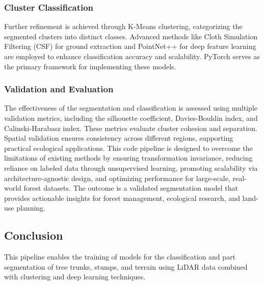 \documentclass[../report.tex]{subfiles}
\begin{document}
\subsubsection{Cluster Classification}
Further refinement is achieved through K-Means clustering, categorizing the segmented clusters into distinct classes. Advanced methods like Cloth Simulation Filtering (CSF) for ground extraction and PointNet++ for deep feature learning are employed to enhance classification accuracy and scalability. PyTorch serves as the primary framework for implementing these models.\cite{ClothSF}\cite{PointNet++}
\subsubsection{Validation and Evaluation}
The effectiveness of the segmentation and classification is assessed using multiple validation metrics, including the silhouette coefficient, Davies-Bouldin index, and Calinski-Harabasz index. These metrics evaluate cluster cohesion and separation. Spatial validation ensures consistency across different regions, supporting practical ecological applications.\cite{Davies-Bouldin}\cite{Calinski}
This code pipeline is designed to overcome the limitations of existing methods by ensuring transformation invariance, reducing reliance on labeled data through unsupervised learning, promoting scalability via architecture-agnostic design, and optimizing performance for large-scale, real-world forest datasets. The outcome is a validated segmentation model that provides actionable insights for forest management, ecological research, and land-use planning.

\subsection{Conclusion}
This pipeline enables the training of models for the classification and part segmentation of tree trunks, stumps, and terrain using LiDAR data combined with clustering and deep learning techniques.
\end{document}
